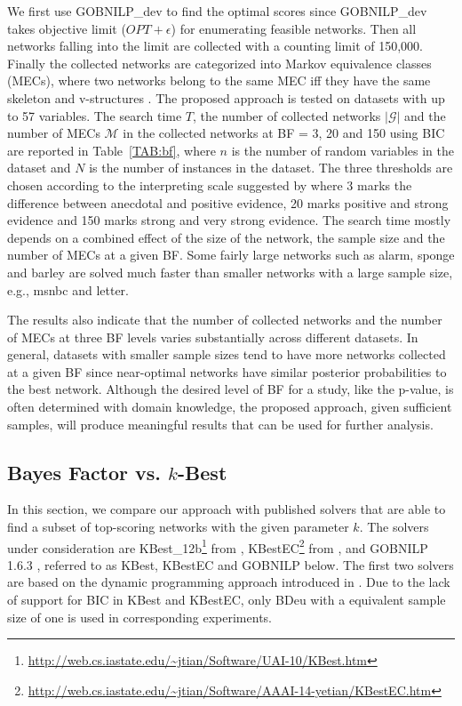 \documentclass[letterpaper]{article}
\newcommand{\opt}{\mathit{OPT}}
\newcommand{\graphset}{\mathcal{G}}
\begin{document}
We first use GOBNILP\_dev to find the optimal scores since GOBNILP\_dev takes objective limit ($\opt + \epsilon$) for enumerating feasible networks. Then all networks falling into the limit are collected with a counting limit of 150,000. Finally the collected networks are categorized into Markov equivalence classes (MECs), where two networks belong to the same MEC iff they have the same skeleton and v-structures \cite{VermaP1990}. The proposed approach is tested on datasets with up to 57 variables. The search time $T$, the number of collected networks $|\graphset|$ and the number of MECs $\mathcal{M}$ in the collected networks at BF = 3, 20 and 150 using BIC are reported in Table~\ref{TAB:bf}, where $n$ is the number of random variables in the dataset and $N$ is the number of instances in the dataset. The three thresholds are chosen according to the interpreting scale suggested by \cite{HeckermanGC95} where 3 marks the difference between anecdotal and positive evidence, 20 marks positive and strong evidence and 150 marks strong and very strong evidence. The search time mostly depends on a combined effect of the size of the network, the sample size and the number of MECs at a given BF. Some fairly large networks such as alarm, sponge and barley are solved much faster than smaller networks with a large sample size, e.g., msnbc and letter.

The results also indicate that the number of collected networks and the number of MECs at three BF levels varies substantially across different datasets. In general, datasets with smaller sample sizes tend to have more networks collected at a given BF since near-optimal networks have similar posterior probabilities to the best network. Although the desired level of BF for a study, like the p-value, is often determined with domain knowledge, the proposed approach, given sufficient samples, will produce meaningful results that can be used for further analysis.


\subsection{Bayes Factor vs. $k$-Best}

In this section, we compare our approach with published solvers that are able to find a subset of top-scoring networks with the given parameter $k$. The solvers under consideration are KBest\_12b\footnote{\url{http://web.cs.iastate.edu/~jtian/Software/UAI-10/KBest.htm}} from \cite{TianHR10}, KBestEC\footnote{\url{http://web.cs.iastate.edu/~jtian/Software/AAAI-14-yetian/KBestEC.htm}} from \cite{ChenT2014}, and GOBNILP 1.6.3
\cite{BartlettC13}, referred to as KBest, KBestEC and GOBNILP below. The first two solvers are based on the dynamic programming approach introduced in \cite{SilanderM06}.
Due to the lack of support for BIC in KBest and KBestEC, only BDeu with a equivalent sample size of one is used in corresponding experiments.
\end{document}
